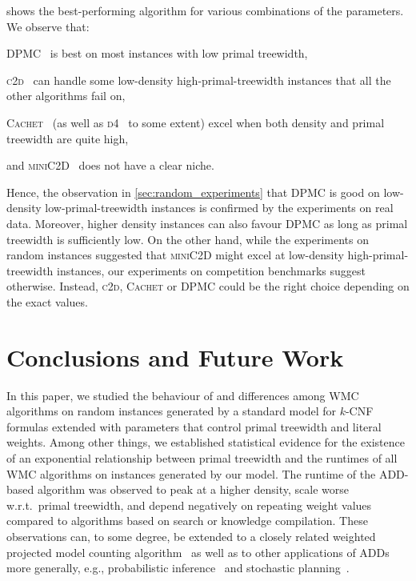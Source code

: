 \documentclass[runningheads]{llncs}
\begin{document}
 shows the best-performing algorithm for various combinations of
the parameters. We observe that:
\begin{enumerate*}[(a)]
  \item \textsc{DPMC}~\cite{DBLP:conf/cp/DudekPV20} is best on most instances
        with low primal treewidth,
  \item \textsc{c2d}~\cite{DBLP:conf/ecai/Darwiche04} can handle some
        low-density high-primal-treewidth instances that all the other
        algorithms fail on,
  \item \textsc{Cachet}~\cite{DBLP:conf/sat/SangBBKP04} (as well as
        \textsc{d4}~\cite{DBLP:conf/ijcai/LagniezM17} to some extent) excel when
        both density and primal treewidth are quite high,
  \item and \textsc{miniC2D}~\cite{DBLP:conf/ijcai/OztokD15} does not have a
        clear niche.
\end{enumerate*}
Hence, the observation in \cref{sec:random_experiments} that \textsc{DPMC} is
good on low-density low-primal-treewidth instances is confirmed by the
experiments on real data. Moreover, higher density instances can also favour
\textsc{DPMC} as long as primal treewidth is sufficiently low. On the other
hand, while the experiments on random instances suggested that \textsc{miniC2D}
might excel at low-density high-primal-treewidth instances, our experiments on
competition benchmarks suggest otherwise. Instead, \textsc{c2d}, \textsc{Cachet}
or \textsc{DPMC} could be the right choice depending on the exact values.

\section{Conclusions and Future Work}

In this paper, we studied the behaviour of and differences among \textsf{WMC}
algorithms on random instances generated by a standard model for $k$-CNF
formulas extended with parameters that control primal treewidth and literal
weights. Among other things, we established statistical evidence for the
existence of an exponential relationship between primal treewidth and the
runtimes of all \textsf{WMC} algorithms on instances generated by our model. The
runtime of the ADD-based algorithm was observed to peak at a higher density,
scale worse w.r.t.\ primal treewidth, and depend negatively on repeating weight
values compared to algorithms based on search or knowledge compilation. These
observations can, to some degree, be extended to a closely related weighted
projected model counting algorithm~\cite{DBLP:conf/sat/DudekPV21} as well as to
other applications of ADDs more generally, e.g., probabilistic
inference~\cite{DBLP:conf/ijcai/ChaviraD07,DBLP:conf/uai/GogateD11} and
stochastic planning~\cite{DBLP:conf/uai/HoeySHB99}.
\end{document}
